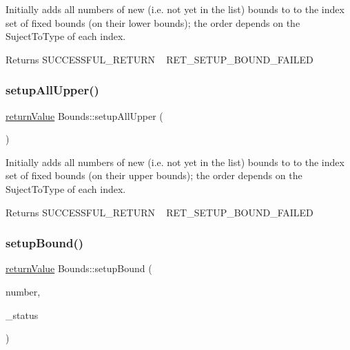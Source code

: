 Initially adds all numbers of new (i.\+e. not yet in the list) bounds to to the index set of fixed bounds (on their lower bounds); the order depends on the Suject\+To\+Type of each index. \begin{DoxyReturn}{Returns}
S\+U\+C\+C\+E\+S\+S\+F\+U\+L\+\_\+\+R\+E\+T\+U\+RN ~\newline
 R\+E\+T\+\_\+\+S\+E\+T\+U\+P\+\_\+\+B\+O\+U\+N\+D\+\_\+\+F\+A\+I\+L\+ED 
\end{DoxyReturn}
\mbox{\label{class_bounds_a0626b894a71f058d3eebf3ee37f6f8d2}} 
\subsubsection{\texorpdfstring{setup\+All\+Upper()}{setupAllUpper()}}
{\footnotesize\ttfamily \hyperlink{_message_handling_8hpp_a81d556f613bfbabd0b1f9488c0fa865e}{return\+Value} Bounds\+::setup\+All\+Upper (\begin{DoxyParamCaption}{ }\end{DoxyParamCaption})}

Initially adds all numbers of new (i.\+e. not yet in the list) bounds to to the index set of fixed bounds (on their upper bounds); the order depends on the Suject\+To\+Type of each index. \begin{DoxyReturn}{Returns}
S\+U\+C\+C\+E\+S\+S\+F\+U\+L\+\_\+\+R\+E\+T\+U\+RN ~\newline
 R\+E\+T\+\_\+\+S\+E\+T\+U\+P\+\_\+\+B\+O\+U\+N\+D\+\_\+\+F\+A\+I\+L\+ED 
\end{DoxyReturn}
\mbox{\label{class_bounds_ae7d4a71da1bfcb331f920d1a1695d001}} 
\subsubsection{\texorpdfstring{setup\+Bound()}{setupBound()}}
{\footnotesize\ttfamily \hyperlink{_message_handling_8hpp_a81d556f613bfbabd0b1f9488c0fa865e}{return\+Value} Bounds\+::setup\+Bound (\begin{DoxyParamCaption}\item[{\hyperlink{_types_8hpp_ab6fd6105e64ed14a0c9281326f05e623}{int\+\_\+t}}]{number,  }\item[{\hyperlink{_types_8hpp_a70a6a40d261a015ead8d43aa589383a4}{Subject\+To\+Status}}]{\+\_\+status }\end{DoxyParamCaption})}

